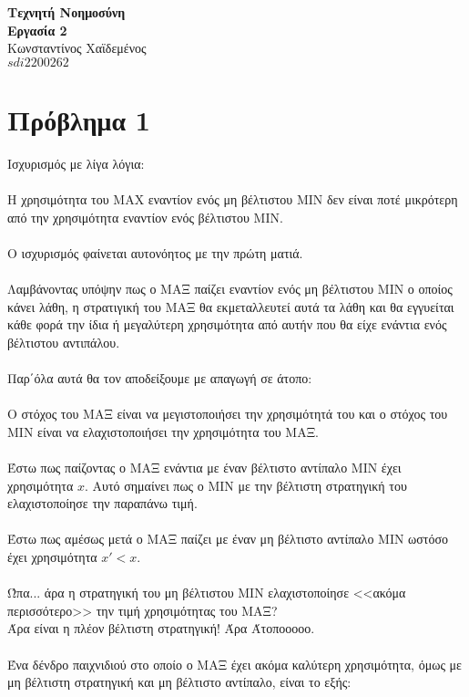 \documentclass[12pt]{article}
\begin{document}
	\begin{center}
    	\huge \textbf{Τεχνητή Νοημοσύνη \\ Εργασία 2}\\
    	\Large Κωνσταντίνος Χαϊδεμένος\\
    	\large $sdi2200262$\\ 
	\end{center}
\vspace{36pt}
\section*{Πρόβλημα 1}
Ισχυρισμός με λίγα λόγια:\\\\
Η χρησιμότητα του MAX εναντίον ενός μη βέλτιστου MIN δεν είναι ποτέ μικρότερη από την χρησιμότητα εναντίον ενός βέλτιστου MIN.\\\\
Ο ισχυρισμός φαίνεται αυτονόητος με την πρώτη ματιά.\\\\
Λαμβάνοντας υπόψην πως ο ΜΑΞ παίζει εναντίον ενός μη βέλτιστου ΜΙΝ ο οποίος κάνει λάθη, η στρατιγική του ΜΑΞ θα εκμεταλλευτεί αυτά τα λάθη και θα εγγυείται κάθε φορά την ίδια ή μεγαλύτερη χρησιμότητα από αυτήν που θα είχε ενάντια ενός βέλτιστου αντιπάλου.\\\\
Παρ΄όλα αυτά θα τον αποδείξουμε με απαγωγή σε άτοπο:\\\\
Ο στόχος του ΜΑΞ είναι να μεγιστοποιήσει την χρησιμότητά του και ο στόχος του ΜΙΝ είναι να ελαχιστοποιήσει την χρησιμότητα του ΜΑΞ.\\\\
Έστω πως παίζοντας ο ΜΑΞ ενάντια με έναν βέλτιστο αντίπαλο ΜΙΝ έχει χρησιμότητα $x$. Αυτό σημαίνει πως ο ΜΙΝ με την βέλτιστη στρατηγική του ελαχιστοποίησε την παραπάνω τιμή.\\\\
Έστω πως αμέσως μετά ο ΜΑΞ παίζει με έναν μη βέλτιστο αντίπαλο ΜΙΝ ωστόσο έχει χρησιμότητα $x' < x$. \\\\
Ώπα... άρα η στρατηγική του μη βέλτιστου ΜΙΝ ελαχιστοποίησε <<ακόμα περισσότερο>> την τιμή χρησιμότητας του ΜΑΞ?\\
Άρα είναι η πλέον βέλτιστη στρατηγική! Άρα Άτοποοοοο.\\\\
Ένα δένδρο παιχνιδιού στο οποίο ο ΜΑΞ έχει ακόμα καλύτερη χρησιμότητα, όμως με μη βέλτιστη στρατηγική και μη βέλτιστο αντίπαλο, είναι το εξής:\\\\
\end{document}
